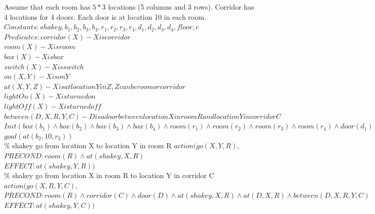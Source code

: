 \documentclass{article}%
\begin{document}
\begin{enumerate}
	Assume that each room has $5 * 3$ locations (5 columns and 3 rows). Corridor has 4 locations for 4 doors. Each door is at location 10 in each room.\\
	 
	$Constants: shakey,b_1, b_2, b_3, b_4, r_1,r_2,r_3,r_4, d_1,d_2,d_3,d_4,floor,c$ \\
	$Predicates: corridor(X) - X is corridor$ \\
	$room(X) - X is room$\\
	$box(X) - X is box$\\
	$switch(X) - X is switch$\\
	$on(X,Y) - X is on Y$\\
	$at(X,Y,Z) - X is at location Y in Z, Z can be room or corridor$\\
	$lightOn(X) - X is turned on $\\
	$lightOff(X) - X is turned off$\\
	$between(D,X,R,Y,C) - D is a door between location X in room R and location Y in corridor C$ \\
	
	$Init(box(b_1) \wedge box(b_2) \wedge box(b_3) \wedge box(b_4) \wedge room(r_1)\wedge room(r_2)\wedge room(r_3)\wedge room(r_4)\wedge door(d_1)\wedge door(d_2)\wedge door(d_3)\wedge door(d_4)\wedge switch(s_1)\wedge switch(s_2)\wedge switch(s_3)\wedge switch(s_4)\wedge corridor(c) \wedge at(b_1,5,r_1)\wedge at(b_2,14,r_1)\wedge at(b_3,13,r_1)\wedge at(b_4,1,r_1)) \wedge at(d_1,10,r_1)\wedge between(d_1,10,r_1, 1, c)\wedge at(d_2,10,r_2)\wedge between(d_2,10,r_2, 2, c)\wedge at(d_3,10,r_3)\wedge between(d_3,10,r_3, 3, c)\wedge at(d_4,10,r_4)\wedge between(d_4,10,r_4, 4, c)\wedge at(shakey,7,r_3) \wedge at(s_1,15,r_1) \wedge at(s_2,15,r_2) \wedge at(s_3,15,r_3) \wedge at(s_4,15,r_4) \wedge lightOn(s_1)\wedge lightOff(s_2)\wedge lightOff(s_3)\wedge lightOn(s_4)$ \\
	$goal(at(b_2,10,r_2)) $ \\
	
	\% shakey go from location X to location Y in room R
	$action( go(X,Y,R), $ \\
	$PRECOND: room(R) \wedge at(shakey,X,R) $\\
	$EFFECT: at(shakey,Y,R)) $\\
	
	\% shakey go from location X in room R to location Y in corridor C
	$action( go(X,R,Y,C), $ \\
	$PRECOND: room(R) \wedge corridor(C) \wedge door(D) \wedge at(shakey,X,R)  \wedge at(D,X,R) \wedge between(D,X,R,Y,C)$ \\
	$EFFECT: at(shakey,Y,C)) $\\
	

\end{enumerate}
\end{document}
